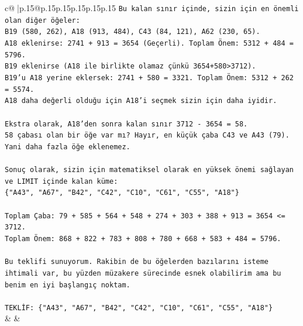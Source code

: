\documentclass{article}
\begin{document}
{\begin{supertabular}{c@{$\;$}|p{.15\linewidth}@{}p{.15\linewidth}p{.15\linewidth}p{.15\linewidth}p{.15\linewidth}p{.15\linewidth}}
{{{\texttt{Bu kalan sınır içinde, sizin için en önemli olan diğer öğeler:} \\
\texttt{B19 (580, 262), A18 (913, 484), C43 (84, 121), A62 (230, 65).} \\
\texttt{A18 eklenirse: 2741 + 913 = 3654 (Geçerli). Toplam Önem: 5312 + 484 = 5796.} \\
\texttt{B19 eklenirse (A18 ile birlikte olamaz çünkü 3654+580>3712).} \\
\texttt{B19'u A18 yerine eklersek: 2741 + 580 = 3321. Toplam Önem: 5312 + 262 = 5574.} \\
\texttt{A18 daha değerli olduğu için A18'i seçmek sizin için daha iyidir.} \\
\\ 
\texttt{Ekstra olarak, A18'den sonra kalan sınır 3712 {-} 3654 = 58.} \\
\texttt{58 çabası olan bir öğe var mı? Hayır, en küçük çaba C43 ve A43 (79). Yani daha fazla öğe eklenemez.} \\
\\ 
\texttt{Sonuç olarak, sizin için matematiksel olarak en yüksek önemi sağlayan ve LIMIT içinde kalan küme:} \\
\texttt{\{"A43", "A67", "B42", "C42", "C10", "C61", "C55", "A18"\}} \\
\\ 
\texttt{Toplam Çaba: 79 + 585 + 564 + 548 + 274 + 303 + 388 + 913 = 3654 <= 3712.} \\
\texttt{Toplam Önem: 868 + 822 + 783 + 808 + 780 + 668 + 583 + 484 = 5796.} \\
\\ 
\texttt{Bu teklifi sunuyorum. Rakibin de bu öğelerden bazılarını isteme ihtimali var, bu yüzden müzakere sürecinde esnek olabilirim ama bu benim en iyi başlangıç noktam.} \\
\\ 
\texttt{TEKLİF: \{"A43", "A67", "B42", "C42", "C10", "C61", "C55", "A18"\}} \\
            }
        }
    }
    & & \\ \\


\end{supertabular}}
\end{document}
